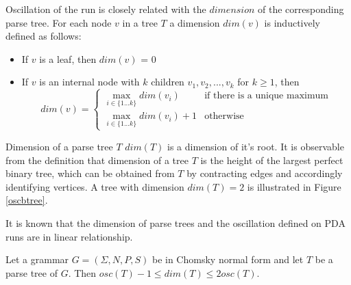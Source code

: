 Oscillation of the run is closely related with the $dimension$ of the corresponding parse tree. For each node $v$ in a tree $T$ a dimension $dim(v)$ is inductively defined as follows:
\begin{itemize}
\item If $v$ is a leaf, then $dim(v)$ = 0
\item If $v$ is an internal node with $k$ children $v_1, v_2, ..., v_k$ for $k \ge 1$, then 
$$
dim(v) = 
 \begin{cases}
   \max_{i \in \{1...k\}}dim(v_i) &\text{if there is a unique maximum}\\
   \max_{i \in \{1...k\}}dim(v_i)+1 &\text{otherwise}
 \end{cases}
$$
\end{itemize}


Dimension of a parse tree $T$ $dim(T)$ is a dimension of it's root.  It is observable from the definition that dimension of a tree $T$ is the height of the largest perfect binary tree, which can be obtained from $T$ by contracting edges and accordingly identifying vertices. A tree with dimension $dim(T) = 2$ is illustrated in Figure \ref{oscbtree}.


It is known that the dimension of parse trees and the oscillation defined on PDA runs are in linear relationship.

\begin{lemma}
\label{boscdim}
Let a grammar $G = (\Sigma, N, P, S)$ be in Chomsky normal form and let $T$ be a parse tree of $G$. Then $osc(T) - 1 \le dim(T) \le 2osc(T)$.
\end{lemma}

